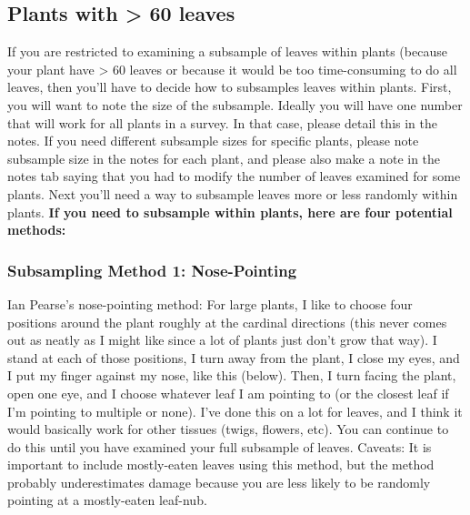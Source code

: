 \documentclass[
  letterpaper,
  DIV=11,
  numbers=noendperiod]{scrreprt}
\begin{document}
\subsection{Plants with \textgreater{} 60
leaves}\label{plants-with-60-leaves-1}

If you are restricted to examining a subsample of leaves within plants
(because your plant have \textgreater{} 60 leaves or because it would be
too time-consuming to do all leaves, then you'll have to decide how to
subsamples leaves within plants. First, you will want to note the size
of the subsample. Ideally you will have one number that will work for
all plants in a survey. In that case, please detail this in the notes.
If you need different subsample sizes for specific plants, please note
subsample size in the notes for each plant, and please also make a note
in the notes tab saying that you had to modify the number of leaves
examined for some plants. Next you'll need a way to subsample leaves
more or less randomly within plants. \textbf{If you need to subsample
within plants, here are four potential methods:}

\subsubsection{Subsampling Method 1:
Nose-Pointing}\label{subsampling-method-1-nose-pointing}

Ian Pearse's nose-pointing method: For large plants, I like to choose
four positions around the plant roughly at the cardinal directions (this
never comes out as neatly as I might like since a lot of plants just
don't grow that way). I stand at each of those positions, I turn away
from the plant, I close my eyes, and I put my finger against my nose,
like this (below). Then, I turn facing the plant, open one eye, and I
choose whatever leaf I am pointing to (or the closest leaf if I'm
pointing to multiple or none). I've done this on a lot for leaves, and I
think it would basically work for other tissues (twigs, flowers, etc).
You can continue to do this until you have examined your full subsample
of leaves. Caveats: It is important to include mostly-eaten leaves using
this method, but the method probably underestimates damage because you
are less likely to be randomly pointing at a mostly-eaten leaf-nub.
\end{document}
